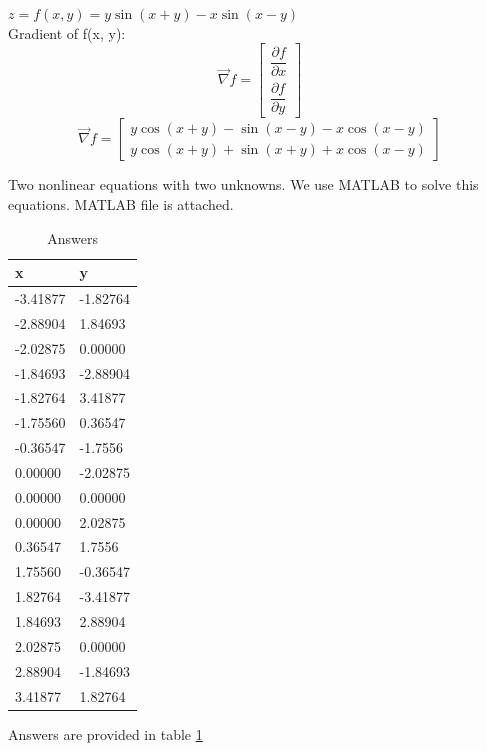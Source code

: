 $z = f(x, y) = y\sin(x+y)-x\sin(x-y)$ \\
Gradient of f(x, y):
$$\vec{\nabla} f = \begin{bmatrix}
	\dfrac{\partial f}{\partial x} \\[6pt]
	\dfrac{\partial f}{\partial y}
\end{bmatrix} $$
$$\vec{\nabla} f = \begin{bmatrix}
	y \cos(x + y) - \sin(x - y) - x  \cos(x - y) \\
	y  \cos(x + y) + \sin(x + y) + x  \cos(x - y)
\end{bmatrix} $$

Two nonlinear equations with two unknowns. We use MATLAB to solve this equations. MATLAB file is attached.
\begin{table}[h]
				\caption {Answers} \label{ans} 
	\begin{center}
		\begin{tabular}{| l | l |}
			\hline
			x & y\TBstrut \\
			\hline
			-3.41877 & -1.82764 \Tstrut\\
			-2.88904 & 1.84693 \Tstrut\\
			-2.02875 & 0.00000 \Tstrut\\
			-1.84693 & -2.88904 \Tstrut\\
			-1.82764 & 3.41877 \Tstrut\\
			-1.75560 & 0.36547 \Tstrut\\
			-0.36547 & -1.7556 \Tstrut\\
			0.00000 & -2.02875 \Tstrut\\
			0.00000 & 0.00000 \Tstrut\\
			0.00000 & 2.02875 \Tstrut\\
			0.36547 & 1.7556 \Tstrut\\
			1.75560 & -0.36547 \Tstrut\\
			1.82764 & -3.41877 \Tstrut\\
			1.84693 & 2.88904 \Tstrut\\
			2.02875 & 0.00000 \Tstrut\\
			2.88904 & -1.84693 \Tstrut\\
			3.41877 & 1.82764 \Tstrut\\
			\hline
		\end{tabular}
	\end{center}
\end{table}
Answers are provided in table \ref{ans}


